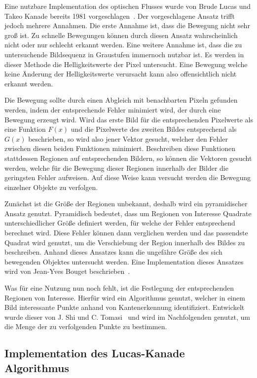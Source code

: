 Eine nutzbare Implementation des optischen Flusses wurde von Brude Lucas und Takeo Kanade bereits 1981 vorgeschlagen~\cite{Lucas1981}.
Der vorgeschlagene Ansatz trifft jedoch mehrere Annahmen.
Die erste Annahme ist, dass die Bewegung nicht sehr gro{\ss} ist.
Zu schnelle Bewegungen können durch diesen Ansatz wahrscheinlich nicht oder nur schlecht erkannt werden.
Eine weitere Annahme ist, dass die zu untersuchende Bildsequenz in Graustufen immernoch nutzbar ist.
Es werden in dieser Methode die Helligkeitswerte der Pixel untersucht.
Eine Bewegung welche keine Änderung der Helligkeitswerte verursacht kann also offensichtlich nicht erkannt werden.

Die Bewegung sollte durch einen Abgleich mit benachbarten Pixeln gefunden werden, indem der entsprechende Fehler minimiert wird, der durch eine Bewegung erzeugt wird.
Wird das erste Bild für die entsprechenden Pixelwerte als eine Funktion $F(x)$ und die Pixelwerte des zweiten Bildes entsprechend als $G(x)$ beschrieben, so wird also jener Vektor gesucht, welcher den Fehler zwischen diesen beiden Funktionen minimiert.
Beschreiben diese Funktionen stattdessen Regionen auf entsprechenden Bildern, so können die Vektoren gesucht werden, welche für die Bewegung dieser Regionen innerhalb der Bilder die geringsten Fehler aufweisen.
Auf diese Weise kann versucht werden die Bewegung einzelner Objekte zu verfolgen.

Zunächst ist die Grö{\ss}e der Regionen unbekannt, deshalb wird ein pyramidischer Ansatz genutzt.
Pyramidisch bedeutet, dass um Regionen von Interesse Quadrate unterschiedlicher Größe definiert werden, für welche der Fehler entsprechend berechnet wird.
Diese Fehler können dann verglichen werden und das passendste Quadrat wird genutzt, um die Verschiebung der Region innerhalb des Bildes zu beschreiben.
Anhand dieses Ansatzes kann die ungefähre Grö{\ss}e des sich bewegenden Objektes untersucht werden.
Eine Implementation dieses Ansatzes wird von Jean-Yves Bouget beschrieben~\cite{Bouguet2000}.

Was für eine Nutzung nun noch fehlt, ist die Festlegung der entsprechenden Regionen von Interesse.
Hierfür wird ein Algorithmus genutzt, welcher in einem Bild interessante Punkte anhand von Kantenerkennung identifiziert.
Entwickelt wurde dieser von J. Shi und C. Tomasi~\cite{Shi1994} und wird im Nachfolgenden genutzt, um die Menge der zu verfolgenden Punkte zu bestimmen.

\subsection{Implementation des Lucas-Kanade Algorithmus}

